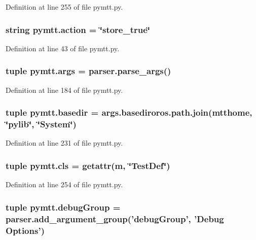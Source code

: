 Definition at line 255 of file pymtt.\-py.

\hypertarget{namespacepymtt_a5ee564a034624d925bb8dc823d11c522}{
\subsubsection[{action}]{\setlength{\rightskip}{0pt plus 5cm}string pymtt.\-action = \char`\"{}store\-\_\-true\char`\"{}}}\label{namespacepymtt_a5ee564a034624d925bb8dc823d11c522}


Definition at line 43 of file pymtt.\-py.

\hypertarget{namespacepymtt_af7633cc372f3357c4f8e6f8dedfe7a8e}{
\subsubsection[{args}]{\setlength{\rightskip}{0pt plus 5cm}tuple pymtt.\-args = parser.\-parse\-\_\-args()}}\label{namespacepymtt_af7633cc372f3357c4f8e6f8dedfe7a8e}


Definition at line 184 of file pymtt.\-py.

\hypertarget{namespacepymtt_a57729393cfbd99464570d7fa5ad9fa05}{
\subsubsection[{basedir}]{\setlength{\rightskip}{0pt plus 5cm}tuple pymtt.\-basedir = args.\-basediroros.\-path.\-join({\bf mtthome}, \char`\"{}pylib\char`\"{}, \char`\"{}System\char`\"{})}}\label{namespacepymtt_a57729393cfbd99464570d7fa5ad9fa05}


Definition at line 231 of file pymtt.\-py.

\hypertarget{namespacepymtt_a17f658b5d141d51664bb3ede8830c4c0}{
\subsubsection[{cls}]{\setlength{\rightskip}{0pt plus 5cm}tuple pymtt.\-cls = getattr({\bf m}, \char`\"{}Test\-Def\char`\"{})}}\label{namespacepymtt_a17f658b5d141d51664bb3ede8830c4c0}


Definition at line 254 of file pymtt.\-py.

\hypertarget{namespacepymtt_af066a010075617c13a5595243ceb9041}{
\subsubsection[{debug\-Group}]{\setlength{\rightskip}{0pt plus 5cm}tuple pymtt.\-debug\-Group = parser.\-add\-\_\-argument\-\_\-group('debug\-Group', 'Debug Options')}}\label{namespacepymtt_af066a010075617c13a5595243ceb9041}


